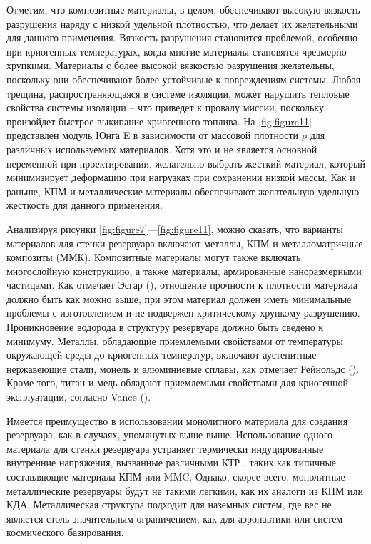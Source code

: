 Отметим, что композитные материалы, в целом, обеспечивают высокую вязкость разрушения наряду с низкой удельной плотностью, что делает их желательными для данного применения. Вязкость разрушения становится проблемой, особенно при криогенных температурах, когда многие материалы становятся чрезмерно хрупкими. Материалы с более высокой вязкостью разрушения желательны, поскольку они обеспечивают более устойчивые к повреждениям системы. Любая трещина, распространяющаяся в системе изоляции, может нарушить тепловые свойства системы изоляции -- что приведет к провалу миссии, поскольку произойдет быстрое выкипание криогенного топлива. На \cref{fig:figure11} представлен модуль Юнга E в зависимости от массовой плотности \(\rho\) для различных используемых материалов. Хотя это и не является основной переменной при проектировании, желательно выбрать жесткий материал, который минимизирует деформацию при нагрузках при сохранении низкой массы. Как и раньше, КПМ и металлические материалы обеспечивают желательную удельную жесткость для данного применения.



Анализируя рисунки \cref{fig:figure7}---\cref{fig:figure11}, можно сказать, что варианты материалов для стенки резервуара включают металлы, КПМ и металломатричные композиты (ММК). Композитные материалы могут также включать многослойную конструкцию, а также материалы, армированные наноразмерными частицами. Как отмечает Эсгар (\cite{esgar1962}), отношение прочности к плотности материала должно быть как можно выше, при этом материал должен иметь минимальные проблемы с изготовлением и не подвержен критическому хрупкому разрушению. Проникновение водорода в структуру резервуара должно быть сведено к минимуму. Металлы, обладающие приемлемыми свойствами от температуры окружающей среды до криогенных температур, включают аустенитные нержавеющие стали, монель и алюминиевые сплавы, как отмечает Рейнольдс (\cite{reynolds1955}). Кроме того, титан и медь обладают приемлемыми свойствами для криогенной эксплуатации, согласно Vance (\cite{vance1964}).

Имеется преимущество в использовании монолитного материала для создания резервуара, как в случаях, упомянутых выше выше. Использование одного материала для стенки резервуара устраняет термически индуцированные внутренние напряжения, вызванные различными КТР , таких как типичные составляющие материала КПМ или MMC. Однако, скорее всего, монолитные металлические резервуары будут не такими легкими, как их аналоги из КПМ или КДА. Металлическая структура подходит для наземных систем, где вес не является столь значительным ограничением, как для аэронавтики или систем космического базирования.

